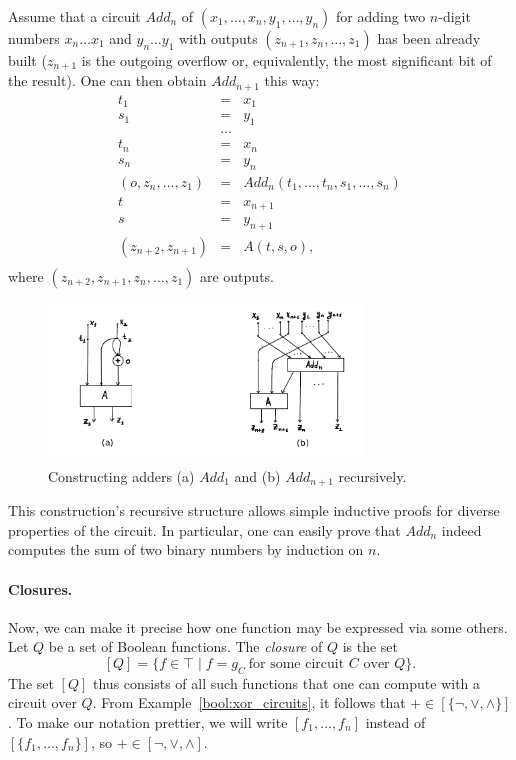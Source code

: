 \documentclass[12pt,notitlepage]{article}
\theoremstyle{plain}
\theoremstyle{definition}
\theoremstyle{plain}
\newcommand{\1}{\mathbf{1}}
\newcommand{\0}{\mathbf{0}}
\begin{document}
Assume that a circuit $Add_n$ of $(x_1,\ldots, x_n, y_1, \ldots, y_n)$ for adding two $n$-digit numbers $x_n \ldots x_1$ and $y_n \ldots y_1$ with outputs $(z_{n+1}, z_n, \ldots, z_1)$ has been already built ($z_{n+1}$ is the outgoing overflow or, equivalently, the most significant bit of the result). One can then obtain $Add_{n+1}$ this way:
$$
\begin{array}{rcl}
	t_1 &=& x_1\\
	s_1 &=& y_1\\
	&\ldots&\\
	t_n &=& x_n\\
	s_n &=& y_n\\
	(o, z_n, \ldots, z_1) &=& Add_n(t_1, \ldots, t_n, s_1, \ldots, s_n)\\
	t &=& x_{n+1}\\
	s &=& y_{n+1}\\
	(z_{n+2}, z_{n+1}) &=& A(t, s, o),\\
\end{array}
$$
where $(z_{n+2}, z_{n+1}, z_n, \ldots, z_1)$ are outputs.

\begin{figure}[h]
	\centering
	\includegraphics*[width=0.75\textwidth]{circuits_adder.pdf}
	\caption{Constructing adders (a) $Add_1$ and (b) $Add_{n+1}$ recursively.}
\end{figure}


This construction's recursive structure allows simple inductive proofs for diverse properties of the circuit. In particular, one can easily prove that $Add_n$ indeed computes the sum of two binary numbers by induction on $n$.

\paragraph{Closures.} Now, we can make it precise how one function may be expressed via some others. Let $Q$ be a set of Boolean functions. The \emph{closure} of $Q$ is the set
$$[Q] = \{ f \in \top \mid f = g_C\ \mbox{for some circuit $C$ over $Q$}\}.$$
The set $[Q]$ thus consists of all such functions that one can compute with a circuit over $Q$. From Example~\ref{bool:xor_circuits}, it follows that ${+} \in [\{ {\neg}, {\vee}, {\wedge} \}]$. To make our notation prettier, we will write $[f_1, \ldots, f_n]$ instead of $[\{ f_1, \ldots, f_n \}]$, so ${+} \in [ {\neg}, {\vee}, {\wedge} ]$.
\end{document}
